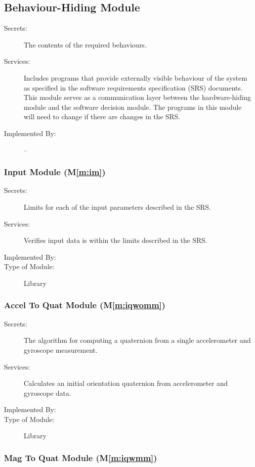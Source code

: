 \documentclass[12pt, titlepage]{article}
\newcommand{\mref}[1]{M\ref{#1}}
\begin{document}
\subsection{Behaviour-Hiding Module}

\begin{description}
\item[Secrets:]The contents of the required behaviours.
\item[Services:]Includes programs that provide externally visible behaviour of the system as
  specified in the software requirements specification (SRS) documents. This module serves as a
  communication layer between the hardware-hiding module and the software decision module. The
  programs in this module will need to change if there are changes in the SRS.
\item[Implemented By:] --
\end{description}

\subsubsection{Input Module (\mref{m:im})}

\begin{description}
\item[Secrets:] Limits for each of the input parameters described in the SRS.
\item[Services:] Verifies input data is within the limits described in the SRS.
\item[Implemented By:] \progname
\item[Type of Module:] Library
\end{description}

\subsubsection{Accel To Quat Module (\mref{m:iqwomm})}

\begin{description}
\item[Secrets:] The algorithm for computing a quaternion from a single accelerometer and gyroscope measurement.
\item[Services:] Calculates an initial orientation quaternion from accelerometer and gyroscope data.
\item[Implemented By:] \progname
\item[Type of Module:] Library
\end{description}

\subsubsection{Mag To Quat Module (\mref{m:iqwmm})}
\end{document}
